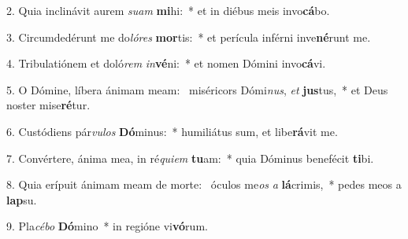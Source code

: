 2. Quia inclinávit aurem \textit{su}\textit{am} \textbf{mi}hi:~*  et in diébus meis invo\textbf{cá}bo.\

3. Circumdedérunt me do\textit{ló}\textit{res} \textbf{mor}tis:~*  et perícula inférni inve\textbf{né}runt me.\

4. Tribulatiónem et doló\textit{rem} \textit{in}\textbf{vé}ni:~*  et nomen Dómini invo\textbf{cá}vi.\

5. O Dómine, líbera ánimam meam: \dag\  miséricors Dómi\textit{nus}, \textit{et} \textbf{jus}tus,~*  et Deus noster mise\textbf{ré}tur.\

6. Custódiens pár\textit{vu}\textit{los} \textbf{Dó}minus:~*  humiliátus sum, et libe\textbf{rá}vit me.\

7. Convértere, ánima mea, in ré\textit{qui}\textit{em} \textbf{tu}am:~*  quia Dóminus benefécit \textbf{ti}bi.\

8. Quia erípuit ánimam meam de morte: \dag\  óculos me\textit{os} \textit{a} \textbf{lá}crimis,~*  pedes meos a \textbf{lap}su.\

9. Pla\textit{cé}\textit{bo} \textbf{Dó}mino~*  in regióne vi\textbf{vó}rum.\

